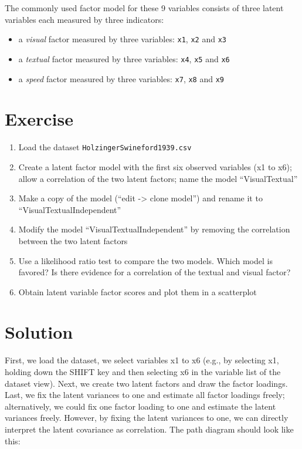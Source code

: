 \documentclass[
  letterpaper,
  DIV=11,
  numbers=noendperiod]{scrreprt}
\begin{document}
The commonly used factor model for these 9 variables consists of three
latent variables each measured by three indicators:

\begin{itemize}
\item
  a \emph{visual} factor measured by three variables: \texttt{x1},
  \texttt{x2} and \texttt{x3}
\item
  a \emph{textual} factor measured by three variables: \texttt{x4},
  \texttt{x5} and \texttt{x6}
\item
  a \emph{speed} factor measured by three variables: \texttt{x7},
  \texttt{x8} and \texttt{x9}
\end{itemize}

\section{Exercise}\label{exercise-2}

\begin{enumerate}
\def\labelenumi{\arabic{enumi}.}
\item
  Load the dataset \texttt{HolzingerSwineford1939.csv}
\item
  Create a latent factor model with the first six observed variables (x1
  to x6); allow a correlation of the two latent factors; name the model
  ``VisualTextual''
\item
  Make a copy of the model (``edit -\textgreater{} clone model'') and
  rename it to ``VisualTextualIndependent''
\item
  Modify the model ``VisualTextualIndependent'' by removing the
  correlation between the two latent factors
\item
  Use a likelihood ratio test to compare the two models. Which model is
  favored? Is there evidence for a correlation of the textual and visual
  factor?
\item
  Obtain latent variable factor scores and plot them in a scatterplot
\end{enumerate}

\section{Solution}\label{solution-2}

First, we load the dataset, we select variables x1 to x6 (e.g., by
selecting x1, holding down the SHIFT key and then selecting x6 in the
variable list of the dataset view). Next, we create two latent factors
and draw the factor loadings. Last, we fix the latent variances to one
and estimate all factor loadings freely; alternatively, we could fix one
factor loading to one and estimate the latent variances freely. However,
by fixing the latent variances to one, we can directly interpret the
latent covariance as correlation. The path diagram should look like
this:
\end{document}
